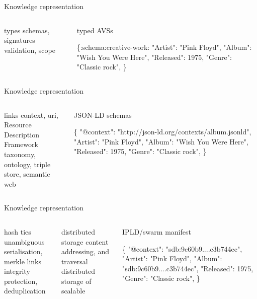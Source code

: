 \begin{frame}{Knowledge representation}
\begin{columns}[t]
  \begin{block}{types}
  schemas, signatures
  validation, scope
  \end{block}
  \begin{block}{typed AVSs}
  \begin{semiverbatim}
\{:schema:creative-work:
"Artist": "Pink Floyd",
"Album": "Wish You Were Here",
"Released": 1975,
"Genre": "Classic rock",
\}
  \end{semiverbatim}
  \end{block}
\end{columns}
\end{frame}


\begin{frame}{Knowledge representation}
\begin{columns}[t]

  \begin{block}{links}
  context, uri,   Resource Description Framework\\
  taxonomy, ontology, triple store, semantic web
  \end{block}
  \begin{block}{JSON-LD schemas}
  \begin{semiverbatim}
\{
"@context": "http://json-ld.org/contexts/album.jsonld",
"Artist": "Pink Floyd",
"Album": "Wish You Were Here",
"Released": 1975,
"Genre": "Classic rock",
\}
  \end{semiverbatim}
  \end{block}

\end{columns}
\end{frame}


\begin{frame}{Knowledge representation}
\begin{columns}[t]


    \begin{block}{hash ties}
    unambiguous serialisation, merkle links \\
    integrity protection, deduplication
    \end{block}

      \begin{block}{distributed storage}
      content addressing, and traversal\\
      distributed storage of scalable
      \end{block}
  \begin{block}{IPLD/swarm manifest}
  \begin{semiverbatim}
\{
"@context": "sdb:9c60b9....c3b744ec",
"Artist": "Pink Floyd",
"Album": "sdb:9c60b9....c3b744ec",
"Released": 1975,
"Genre": "Classic rock",
\}
  \end{semiverbatim}
  \end{block}

\end{columns}
\end{frame}


